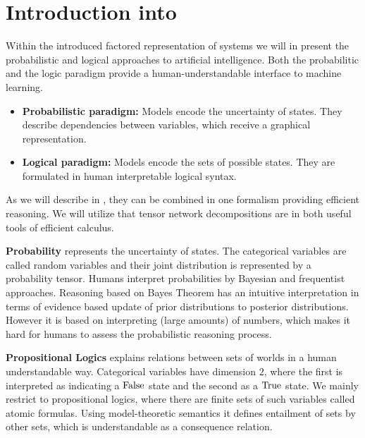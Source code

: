 \chapter{Introduction into }

Within the introduced factored representation of systems we will in  present the probabilistic and logical approaches to artificial intelligence.
Both the probabilitic and the logic paradigm provide a human-understandable interface to machine learning.
\begin{itemize}
    \item \textbf{Probabilistic paradigm:} Models encode the uncertainty of states.
        They describe dependencies between variables, which receive a graphical representation.
    \item \textbf{Logical paradigm:} Models encode the sets of possible states.
        They are formulated in human interpretable logical syntax.
\end{itemize}
As we will describe in , they can be combined in one formalism providing efficient reasoning.
We will utilize that tensor network decompositions are in both useful tools of efficient calculus.



\textbf{Probability} represents the uncertainty of states.
The categorical variables are called random variables and their joint distribution is represented by a probability tensor.
Humans interpret probabilities by Bayesian and frequentist approaches.
Reasoning based on Bayes Theorem has an intuitive interpretation in terms of evidence based update of prior distributions to posterior distributions.
However it is based on interpreting (large amounts) of numbers, which makes it hard for humans to assess the probabilistic reasoning process.

\textbf{Propositional Logics} explains relations between sets of worlds in a human understandable way.
Categorical variables have dimension $2$, where the first is interpreted as indicating a $\mathrm{False}$ state and the second as a $\mathrm{True}$ state.
We mainly restrict to propositional logics, where there are finite sets of such variables called atomic formulas.
Using model-theoretic semantics it defines entailment of sets by other sets, which is understandable as a consequence relation.


